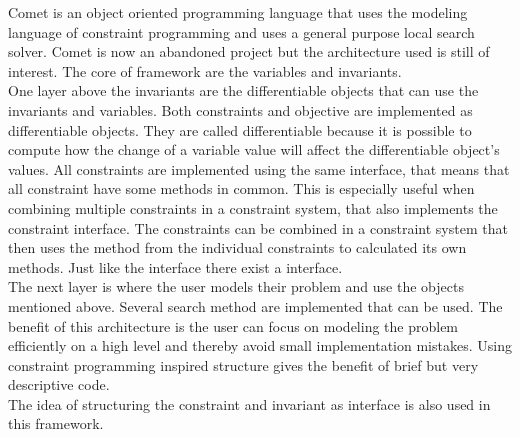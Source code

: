 

Comet is an object oriented programming language that uses the modeling language of constraint programming and uses a 
general purpose local search solver. Comet is now an abandoned project but the architecture used is still of interest. 
The core of framework are the variables and invariants.
\medskip \\
One layer above the invariants are the differentiable objects that can use the invariants and variables. 
Both constraints and objective are implemented as differentiable objects. They are called differentiable 
because it is possible to compute how the change of a variable value will affect the differentiable object's values. 
All constraints are implemented using the same interface, that means that all constraint have some methods in common. 
This is especially useful when combining multiple constraints in a constraint system, that also implements the 
constraint interface. The constraints can be combined in a constraint system that then uses the method from the 
individual constraints to calculated its own methods. Just like the  interface there exist a 
 interface. \medskip \\ 
The next layer is where the user models their problem and use the objects mentioned above. Several search method are 
implemented that can be used. The benefit of this architecture is the user can focus on modeling the problem 
efficiently on a high level and thereby avoid small implementation mistakes. Using constraint programming inspired 
structure gives the benefit of brief but very descriptive code. \\ 
The idea of structuring the constraint and invariant as interface is also used in this framework. 



